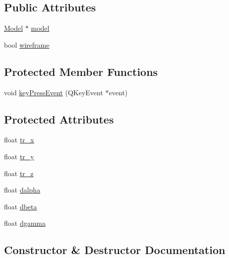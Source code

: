 \subsection*{Public Attributes}
\begin{DoxyCompactItemize}
\item 
\mbox{\hyperlink{class_model}{Model}} $\ast$ \mbox{\hyperlink{class_main_window_a6ceb394c6a471fb60dce6bd3f7c78475}{model}}
\item 
bool \mbox{\hyperlink{class_main_window_aa63776c884a82936064be5aabe3da6e8}{wireframe}}
\end{DoxyCompactItemize}
\subsection*{Protected Member Functions}
\begin{DoxyCompactItemize}
\item 
void \mbox{\hyperlink{class_main_window_a9c4f542263838b9ecd06eae839a42a34}{key\+Press\+Event}} (Q\+Key\+Event $\ast$event)
\end{DoxyCompactItemize}
\subsection*{Protected Attributes}
\begin{DoxyCompactItemize}
\item 
float \mbox{\hyperlink{class_main_window_a243e9877c34fca99ca8eb8233e602e80}{tr\+\_\+x}}
\item 
float \mbox{\hyperlink{class_main_window_a93fc2a7aa546e29b1ec00c81d278d9c2}{tr\+\_\+y}}
\item 
float \mbox{\hyperlink{class_main_window_a48e1e4cfdaa4d52f32b46ece5e1e785b}{tr\+\_\+z}}
\item 
float \mbox{\hyperlink{class_main_window_a8a40d17a32ac50fc54faf17a3ddc1b21}{dalpha}}
\item 
float \mbox{\hyperlink{class_main_window_a7a6b42f86582dd883162c70d4a4915c8}{dbeta}}
\item 
float \mbox{\hyperlink{class_main_window_ac10de49b138c1c838d53e12da4c24d6d}{dgamma}}
\end{DoxyCompactItemize}


\subsection{Constructor \& Destructor Documentation}
\mbox{\label{class_main_window_a8b244be8b7b7db1b08de2a2acb9409db}} 
